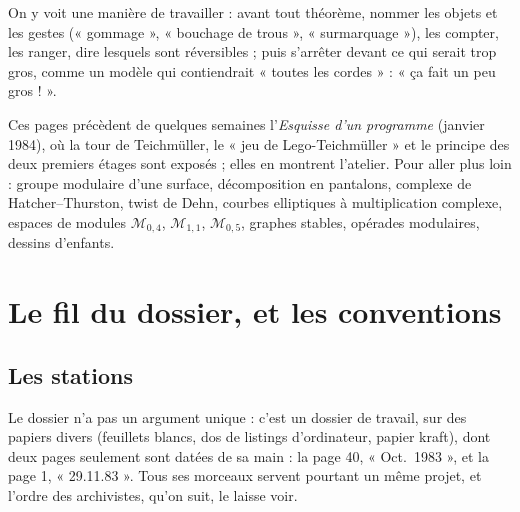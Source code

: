 \documentclass[11pt,a4paper]{article}
\begin{document}
\begin{resume}
On y voit une manière de travailler : avant tout théorème, nommer les objets
et les gestes (« gommage », « bouchage de trous », « surmarquage »), les
compter, les ranger, dire lesquels sont réversibles ; puis s'arrêter devant ce
qui serait trop gros, comme un modèle qui contiendrait « toutes les cordes » : « ça
fait un peu gros ! ».

Ces pages précèdent de quelques semaines l'\emph{Esquisse d'un programme}
(janvier 1984), où la tour de Teichmüller, le « jeu de Lego-Teichmüller » et le
principe des deux premiers étages sont exposés ; elles en montrent l'atelier.
Pour aller plus loin : groupe modulaire d'une surface, décomposition en
pantalons, complexe de Hatcher–Thurston, twist de Dehn, courbes elliptiques à
multiplication complexe, espaces de modules $\mathcal{M}_{0,4}$, $\mathcal{M}_{1,1}$,
$\mathcal{M}_{0,5}$, graphes stables, opérades modulaires, dessins d'enfants.

\end{resume}

\section*{Le fil du dossier, et les conventions}

\subsection*{Les stations}

Le dossier n'a pas un argument unique : c'est un dossier de travail, sur des
papiers divers (feuillets blancs, dos de listings d'ordinateur, papier kraft),
dont deux pages seulement sont datées de sa main : la page 40, « Oct.\ 1983 »,
et la page 1, « 29.11.83 ». Tous ses morceaux servent pourtant un même projet, et
l'ordre des archivistes, qu'on suit, le laisse voir.
\end{document}
